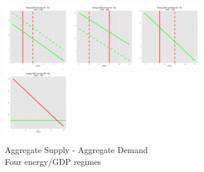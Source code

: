\documentclass[final]{beamer}
\begin{document}
\begin{frame}
\begin{figure}[p!]
		\caption{Aggregate Supply - Aggregate Demand \\ Four energy/GDP regimes}
		\label{fig:asad}		
		\centerline{
		\mbox{\includegraphics[width=0.25\textwidth]{era1}}
		\mbox{\includegraphics[width=0.25\textwidth]{era2}}
		\mbox{\includegraphics[width=0.25\textwidth]{era3}}
		\mbox{\includegraphics[width=0.25\textwidth]{era4}}				
		}
		\end{figure}
\end{frame}
\end{document}
